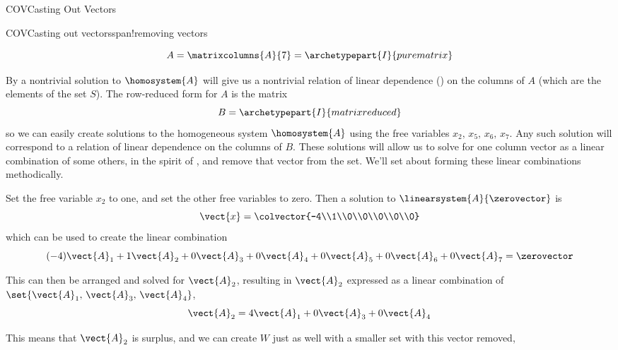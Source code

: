 \begin{subsect}{COV}{Casting Out Vectors}
\begin{example}{COV}{Casting out vectors}{span!removing vectors}
\begin{para}
%
\begin{equation*}
A=\matrixcolumns{A}{7}=\archetypepart{I}{purematrix}\end{equation*}
\end{para}
%
\begin{para}By  a nontrivial solution to $\homosystem{A}$ will give us a nontrivial relation of linear dependence () on the columns of $A$ (which are the elements of the set $S$).  The row-reduced form for $A$ is the matrix
%
\begin{equation*}
B=\archetypepart{I}{matrixreduced}\end{equation*}
%
so we can easily create solutions to the homogeneous system $\homosystem{A}$ using the free variables $x_2,\,x_5,\,x_6,\,x_7$.  Any such solution will correspond to a relation of linear dependence on the columns of $B$.  These solutions will allow us to solve for one column vector as a linear combination of some others, in the spirit of , and remove that vector from the set.  We'll set about forming these linear combinations methodically.\end{para}
%
\begin{para}Set the free variable $x_2$ to one, and set the other free variables to zero.  Then a solution to $\linearsystem{A}{\zerovector}$ is
%
\begin{equation*}
\vect{x}=\colvector{-4\\1\\0\\0\\0\\0\\0}
\end{equation*}
%
which can be used to create the linear combination
%
\begin{equation*}
(-4)\vect{A}_1+
1\vect{A}_2+
0\vect{A}_3+
0\vect{A}_4+
0\vect{A}_5+
0\vect{A}_6+
0\vect{A}_7
=\zerovector
\end{equation*}
\end{para}
%
\begin{para}This can then be arranged and solved for $\vect{A}_2$, resulting in $\vect{A}_2$ expressed as a linear combination of $\set{\vect{A}_1,\,\vect{A}_3,\,\vect{A}_4}$,
%
\begin{equation*}
\vect{A}_2=
4\vect{A}_1+
0\vect{A}_3+
0\vect{A}_4
\end{equation*}
\end{para}
%
\begin{para}This means that $\vect{A}_2$ is surplus, and we can create $W$ just as well with a smaller set with  this vector removed,

\end{para}
\end{example}
\end{subsect}
